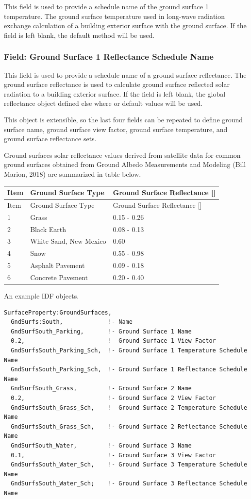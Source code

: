 This field is used to provide a schedule name of the ground surface 1 temperature. The ground surface temperature used in long-wave radiation exchange calculation of a building exterior surface with the ground surface. If the field is left blank, the default method will be used.

\subsubsection{Field: Ground Surface 1 Reflectance Schedule Name}\label{field-ground-surface-1-reflectance-schedule-name}

This field is used to provide a schedule name of a ground surface reflectance. The ground surface reflectance is used to calculate ground surface reflected solar radiation to a building exterior surface. If the field is left blank, the global reflectance object defined else where or default values will be used.

This object is extensible, so the last four fields can be repeated to define ground surface name, ground surface view factor, ground surface temperature, and ground surface reflectance sets.

Ground surfaces solar reflectance values derived from satellite data for common ground surfaces obtained from Ground Albedo Measurements and Modeling (Bill Marion, 2018) are summarized in table below.

\begin{longtable}[c]{p{1.0in}p{2.5in}p{2.5in}}
\toprule
Item & Ground Surface Type & Ground Surface Reflectance [] \tabularnewline
\midrule
\endfirsthead

\toprule
Item & Ground Surface Type & Ground Surface Reflectance [] \tabularnewline
\midrule
\endhead

1 & Grass & 0.15  -  0.26 \tabularnewline
2 & Black Earth & 0.08  -  0.13 \tabularnewline
3 & White Sand, New Mexico & 0.60 \tabularnewline
4 & Snow & 0.55  -  0.98 \tabularnewline
5 & Asphalt Pavement & 0.09  -  0.18 \tabularnewline
6 & Concrete Pavement & 0.20  -  0.40 \tabularnewline

\bottomrule
\end{longtable}

An example IDF objects.

\begin{lstlisting}
SurfaceProperty:GroundSurfaces,
  GndSurfs:South,             !- Name
  GndSurfSouth_Parking,       !- Ground Surface 1 Name
  0.2,                        !- Ground Surface 1 View Factor
  GndSurfsSouth_Parking_Sch,  !- Ground Surface 1 Temperature Schedule Name
  GndSurfsSouth_Parking_Sch,  !- Ground Surface 1 Reflectance Schedule Name
  GndSurfSouth_Grass,         !- Ground Surface 2 Name
  0.2,                        !- Ground Surface 2 View Factor
  GndSurfsSouth_Grass_Sch,    !- Ground Surface 2 Temperature Schedule Name
  GndSurfsSouth_Grass_Sch,    !- Ground Surface 2 Reflectance Schedule Name
  GndSurfSouth_Water,         !- Ground Surface 3 Name
  0.1,                        !- Ground Surface 3 View Factor
  GndSurfsSouth_Water_Sch,    !- Ground Surface 3 Temperature Schedule Name
  GndSurfsSouth_Water_Sch;    !- Ground Surface 3 Reflectance Schedule Name
\end{lstlisting}

